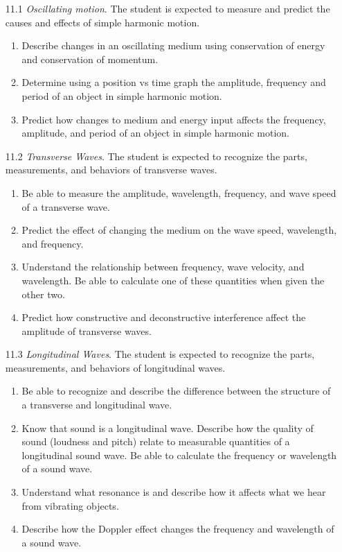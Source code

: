 \documentclass[dvipsnames]{article}
\begin{document}
\begin{enumerate}
    \item[11.1] \textit{Oscillating motion}. The student is expected to measure and predict the causes and effects of simple harmonic motion.
    \begin{enumerate}
        \item Describe changes in an oscillating medium using conservation of energy and conservation of momentum.
        \item Determine using a position vs time graph the amplitude, frequency and period of an object in simple harmonic motion.
        \item Predict how changes to medium and energy input affects the frequency, amplitude, and period of an object in simple harmonic motion.
    \end{enumerate}
    \item[11.2] \textit{Transverse Waves}. The student is expected to recognize the parts, measurements, and behaviors of transverse waves.
    \begin{enumerate}
        \item Be able to measure the amplitude, wavelength, frequency, and wave speed of a transverse wave.
        \item Predict the effect of changing the medium on the wave speed, wavelength, and frequency.
        \item Understand the relationship between frequency, wave velocity, and wavelength.  Be able to calculate one of these quantities when given the other two.
        \item Predict how constructive and deconstructive interference affect the amplitude of transverse waves.
    \end{enumerate}
    \item[11.3] \textit{Longitudinal Waves}. The student is expected to recognize the parts, measurements, and behaviors of longitudinal waves.
    \begin{enumerate}
        \item Be able to recognize and describe the difference between the structure of a transverse and longitudinal wave.
        \item Know that sound is a longitudinal wave.  Describe how the quality of sound (loudness and pitch) relate to measurable quantities of a longitudinal sound wave.  Be able to calculate the frequency or wavelength of a sound wave.
        \item Understand what resonance is and describe how it affects what we hear from vibrating objects.
        \item Describe how the Doppler effect changes the frequency and wavelength of a sound wave.
    \end{enumerate}
\end{enumerate}
\end{document}
